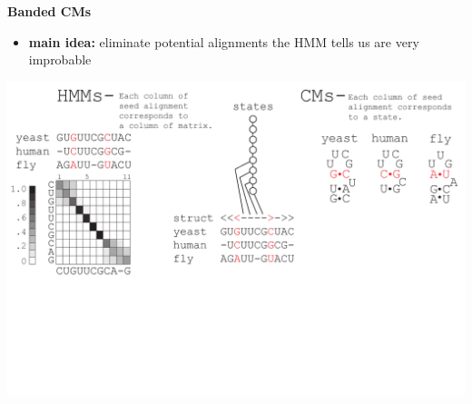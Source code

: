 \documentclass[landscape]{slides}
\begin{document}
\begin{slide}
\begin{center}
\large
\textbf{Banded CMs}
\end{center}
\medskip
\small
\begin{itemize}
\item
\textbf{main idea:} eliminate potential alignments the HMM tells us are very improbable
\end{itemize}
\begin{center}
\includegraphics[width=8in]{figs/post_hmm_to_cm_map2_layer6}
\end{center}
\vfill
\end{slide}
\end{document}
